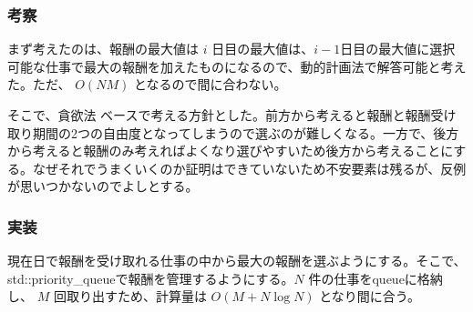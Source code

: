 \documentclass{jarticle}
\begin{document}
\subsubsection*{考察}
まず考えたのは、報酬の最大値は $i$ 日目の最大値は、$i - 1$日目の最大値に選択可能な仕事で最大の報酬を加えたものになるので、動的計画法で解答可能と考えた。ただ、 $O(NM)$ となるので間に合わない。

そこで、貪欲法 ベースで考える方針とした。前方から考えると報酬と報酬受け取り期間の2つの自由度となってしまうので選ぶのが難しくなる。一方で、後方から考えると報酬のみ考えればよくなり選びやすいため後方から考えることにする。なぜそれでうまくいくのか証明はできていないため不安要素は残るが、反例が思いつかないのでよしとする。

\subsubsection*{実装}
現在日で報酬を受け取れる仕事の中から最大の報酬を選ぶようにする。そこで、std::priority\_queueで報酬を管理するようにする。$N$ 件の仕事をqueueに格納し、 $M$ 回取り出すため、計算量は $O(M + N\log N)$ となり間に合う。
\end{document}
